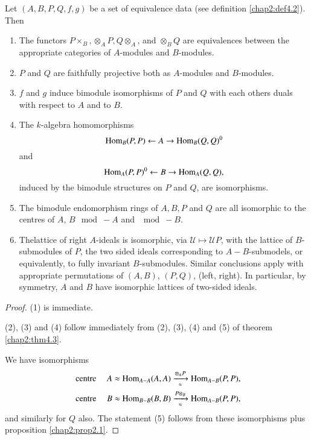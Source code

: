 \begin{theorem}\label{chap2:thm4.4}%
Let $(A, B, P, Q, f, g)$ be a set of equivalence data (see definition
\ref{chap2:def4.2}). Then  
\begin{enumerate}[(1)]
\item The functors $P \times_B, \otimes_A P, Q \otimes_A$, and
  $\otimes_B Q$ are equivalences between the appropriate categories
  of $A$-modules and $B$-modules.  

\item $P$ and $Q$ are faithfully projective both as $A$-modules and
  $B$-modules.  

\item $f$ and $g$ induce bimodule isomorphisms of $P$ and $Q$ with each
  others duals with respect to $A$ and to $B$.  

\item The $k$-algebra homomorphisms 
$$
\operatorname{Hom}_{B}(P, P) \leftarrow A \rightarrow \operatorname{Hom}_B (Q, Q)^0 
$$
and
$$
\operatorname{Hom}_A (P, P)^0 \leftarrow B \rightarrow \operatorname{Hom}_A (Q, Q),
$$
induced by the bimodule structures on $P$ and $Q$, are isomorphisms.  

\item The bimodule endomorphism rings of $A, B, P$ and $Q$ are all
  isomorphic to the centres of $A$, $B \mod-A$ and $\mod - B$.  

\item The\pageoriginale lattice of right $A$-ideals is isomorphic, via
  $\mathscr{U} 
  \mapsto \mathscr{U}P$, with the lattice of $B$-submodules of $P$, the
  two sided ideals corresponding to $A - B$-submodels, or equivalently,
  to fully invariant $B$-submodules. Similar conclusions apply with
  appropriate permutations of $(A, B)$, $(P, Q)$, (left, right). In
  particular, by symmetry, $A$ and $B$ have isomorphic lattices of
  two-sided ideals.  
\end{enumerate}
\end{theorem}

\begin{proof}
(1) is immediate.
 
(2), (3) and (4) follow immediately from (2), (3), (4) and
(5) of theorem \ref{chap2:thm4.3}. 

We have isomorphisms 
\begin{align*}
\text{centre }\quad & A \approx \operatorname{Hom}_{A - A} (A,
A)\xrightarrow[\approx]{\otimes_AP} \operatorname{Hom}_{A - B} (P, P), \\ 
\text{ centre }\quad  & B \approx \operatorname{Hom}_{B - B} (B,
B)\xrightarrow[\approx]{P\otimes_B} \operatorname{Hom}_{A - B} (P, P),  
\end{align*}
and similarly for $Q$ also. The statement (5) follows from these
isomorphisms plus proposition \ref{chap2:prop2.1}.  
\end{proof}

